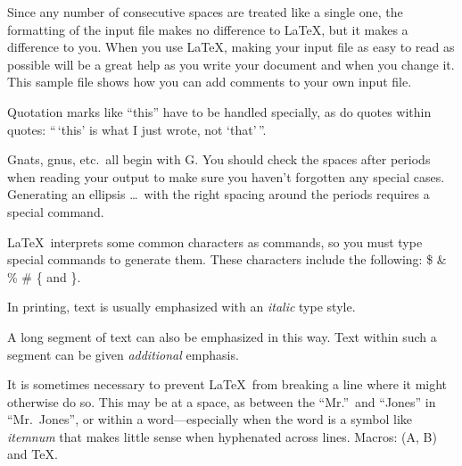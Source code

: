 \documentclass{article}
\newcommand{\ip}[2]{(#1, #2)}
\begin{document}
Since any number of consecutive spaces are treated
like a single one, the formatting of the input
file makes no difference to
      \LaTeX,
but it makes a difference to you.  When you use
\LaTeX, making your input file as easy to read
as possible will be a great help as you write
your document and when you change it.  This sample
file shows how you can add comments to your own input
file.

Quotation marks like
       ``this''
have to be handled specially, as do quotes within
quotes:
       ``\,`this'
        is what I just
        wrote, not  `that'\,''.

       Gnats, gnus, etc.\ all
       begin with G\@.
You should check the spaces after periods when
reading your output to make sure you haven't
forgotten any special cases.  Generating an
ellipsis
       \ldots\
with the right spacing around the periods requires
a special command.

\LaTeX\ interprets some common characters as
commands, so you must type special commands to
generate them.  These characters include the
following:
       \$ \& \% \# \{ and \}.

In printing, text is usually emphasized with an
       \emph{italic}
type style.

\begin{em}
   A long segment of text can also be emphasized
   in this way.  Text within such a segment can be
   given \emph{additional} emphasis.
\end{em}

It is sometimes necessary to prevent \LaTeX\ from
breaking a line where it might otherwise do so.
This may be at a space, as between the ``Mr.''\ and
``Jones'' in
       ``Mr.~Jones'',
or within a word---especially when the word is a
symbol like
       \mbox{\emph{itemnum}}
that makes little sense when hyphenated across
lines. Macros: \ip{A}{B} and \TeX.
\end{document}
